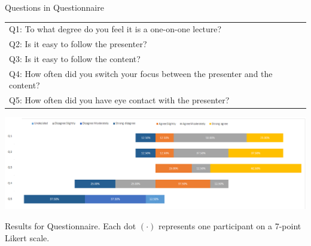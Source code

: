 \documentclass[sigchi-a]{acmart}
\begin{document}
\begin{margintable}
    \caption{Questions in Questionnaire}
    \label{tab:table2}
    \begin{tabular}{p{5.5cm}}
    \toprule
      Q1: To what degree do you feel it is a one-on-one lecture?\\
      Q2: Is it easy to follow the presenter?\\
      Q3: Is it easy to follow the content?\\
      Q4: How often did you switch your focus between the presenter and the content?\\
      Q5: How often did you have eye contact with the presenter?\\
      \bottomrule
    \end{tabular}
\end{margintable}

\begin{marginfigure}
    \includegraphics[width=\marginparwidth]{lr}
    \caption{Results for Questionnaire. Each dot $\left(\cdot\right)$ represents one participant on a 7-point Likert scale.}
    \label{fig:results}
\end{marginfigure}



\end{document}
